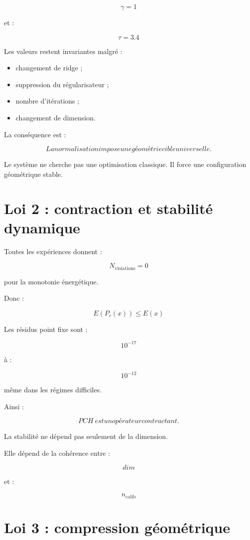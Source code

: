 \documentclass[11pt]{article}
\begin{document}
\[
\gamma=1
\]

et :

\[
\tau=3.4
\]


Les valeurs restent invariantes malgré :

\begin{itemize}
\item changement de ridge ;
\item suppression du régularisateur ;
\item nombre d'itérations ;
\item changement de dimension.
\end{itemize}


La conséquence est :

\[
\boxed{
La normalisation impose une géométrie cible universelle.
}
\]


Le système ne cherche pas une optimisation classique.
Il force une configuration géométrique stable.


\section{Loi 2 : contraction et stabilité dynamique}


Toutes les expériences donnent :

\[
N_{\mathrm{violations}}=0
\]


pour la monotonie énergétique.


Donc :

\[
E(P_c(x))\leq E(x)
\]


Les résidus point fixe sont :

\[
10^{-17}
\]

à :

\[
10^{-12}
\]


même dans les régimes difficiles.


Ainsi :

\[
\boxed{
PCH\ est un opérateur contractant.
}
\]


La stabilité ne dépend pas seulement de la dimension.


Elle dépend de la cohérence entre :

\[
dim
\]

et :

\[
n_{\mathrm{calib}}
\]


\section{Loi 3 : compression géométrique}
\end{document}
